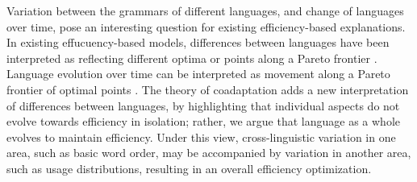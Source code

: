 \documentclass[11pt,a4paper]{article}
\begin{document}
Variation between the grammars of different languages, and change of languages over time, pose an interesting question for existing efficiency-based explanations.
In existing effucuency-based models, differences between languages have been interpreted as reflecting different optima or points along a Pareto frontier \citep{zaslavsky2018efficient, hahn2020universals}.
Language evolution over time can be interpreted as movement along a Pareto frontier of optimal points \citep{zaslavsky2019evolution}.
The theory of coadaptation adds a new interpretation of differences between languages, by highlighting that individual aspects do not evolve towards efficiency in isolation; rather, we argue that language as a whole evolves to maintain efficiency.
Under this view, cross-linguistic variation in one area, such as basic word order, may be accompanied by variation in another area, such as usage distributions, resulting in an overall efficiency optimization.



\end{document}
